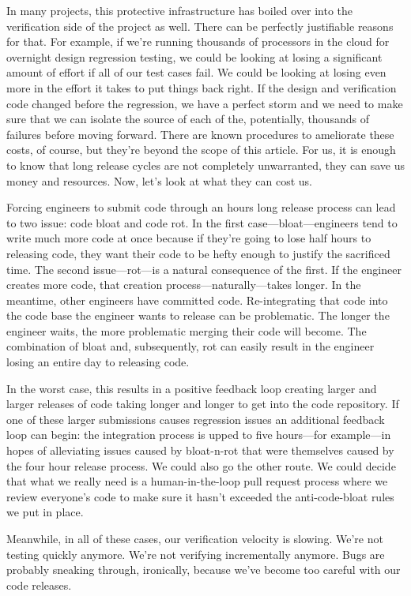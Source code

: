 \documentclass[twocolumn,letterpaper]{IEEEAerospaceCLS}  %
\begin{document}
In many projects, this protective infrastructure has boiled over into the verification side of the project as well. There can be perfectly justifiable reasons for that. For example, if we're running thousands of processors in the cloud for overnight design regression testing, we could be looking at losing a significant amount of effort if all of our test cases fail. We could be looking at losing even more in the effort it takes to put things back right. If the design and verification code changed before the regression, we have a perfect storm and we need to make sure that we can isolate the source of each of the, potentially, thousands of failures before moving forward. There are known procedures to ameliorate these costs, of course, but they're beyond the scope of this article. For us, it is enough to know that long release cycles are not completely unwarranted, they can save us money and resources. Now, let's look at what they can cost us.

Forcing engineers to submit code through an hours long release process can lead to two issue: code bloat and code rot. In the first case—bloat—engineers tend to write much more code at once because if they're going to lose half hours to releasing code, they want their code to be hefty enough to justify the sacrificed time. The second issue—rot—is a natural consequence of the first. If the engineer creates more code, that creation process—naturally—takes longer. In the meantime, other engineers have committed code. Re-integrating that code into the code base the engineer wants to release can be problematic. The longer the engineer waits, the more problematic merging their code will become. The combination of bloat and, subsequently, rot can easily result in the engineer losing an entire day to releasing code. 

In the worst case, this results in a positive feedback loop creating larger and larger releases of code taking longer and longer to get into the code repository. If one of these larger submissions causes regression issues  an additional feedback loop can begin: the integration process is upped to five hours—for example—in hopes of alleviating issues caused by bloat-n-rot that were themselves caused by the four hour release process. We could also go the other route. We could decide that what we really need is a human-in-the-loop pull request process where we review everyone's code to make sure it hasn't exceeded the anti-code-bloat rules we put in place.

Meanwhile, in all of these cases, our verification velocity is slowing. We're not testing quickly anymore. We're not verifying incrementally anymore. Bugs are probably sneaking through, ironically, because we've become too careful with our code releases.
\end{document}
